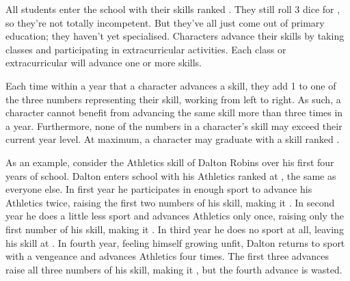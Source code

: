 All students enter the school with their skills ranked .
They still roll 3 dice for {\tests}, so they're not totally incompetent.
But they've all just come out of primary education; they haven't yet specialised.
Characters advance their skills by taking classes and participating in extracurricular activities.
Each class or extracurricular will advance one or more skills.

Each time within a year that a character advances a skill, they add 1 to one of the three numbers representing their skill, working from left to right.
As such, a character cannot benefit from advancing the same skill more than three times in a year.
Furthermore, none of the numbers in a character's skill may exceed their current year level.
At maximum, a character may graduate with a skill ranked .

As an example, consider the Athletics skill of Dalton Robins over his first four years of school.
Dalton enters school with his Athletics ranked at , the same as everyone else.
In first year he participates in enough sport to advance his Athletics twice, raising the first two numbers of his skill, making it .
In second year he does a little less sport and advances Athletics only once, raising only the first number of his skill, making it .
In third year he does no sport at all, leaving his skill at .
In fourth year, feeling himself growing unfit, Dalton returns to sport with a vengeance and advances Athletics four times.
The first three advances raise all three numbers of his skill, making it , but the fourth advance is wasted.
